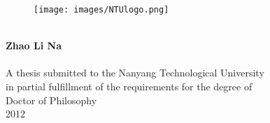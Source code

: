 \begin{titlepage}
\begin{center}

\begin{figure}[H]
    \texttt{[image: images/NTUlogo.png]}
\end{figure}

\vspace*{1.8cm}
 \\
\vspace*{1.5cm}
\noindent \large \textbf{Zhao Li Na} \\
\vspace*{4.5cm}
\vspace*{0.3cm}
 \\

\vspace*{1.5cm}
A thesis submitted to the Nanyang Technological University \\
in partial fulfillment of the requirements for the degree of \\
Doctor of Philosophy \\
\vspace*{0.5cm}
2012
\end{center}

\end{titlepage}
\sloppy

\titlepage

